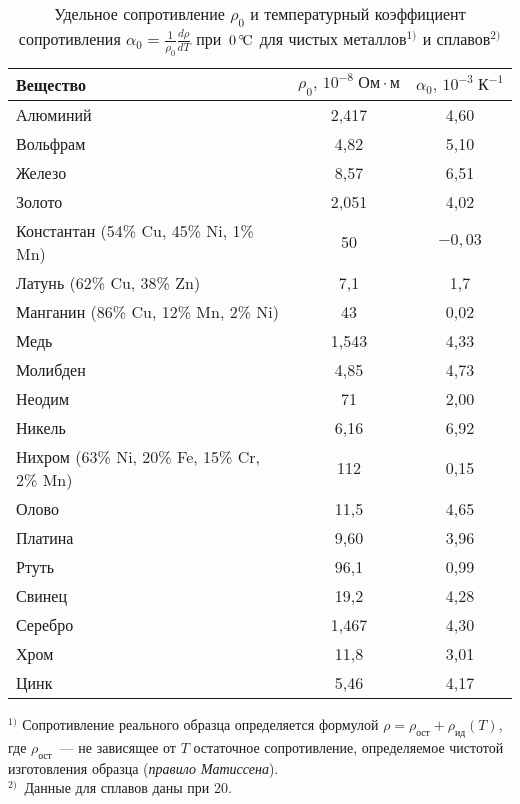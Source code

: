 \begin{table}
\caption{Удельное сопротивление $\rho_0$ и температурный коэффициент 
    сопротивления  $\alpha_0 = \frac{1}{\rho_0}\frac{d\rho}{dT}$ при~$0\,^\circ\!\mathrm{C}$
    для чистых металлов$^{1)}$ и сплавов$^{2)}$}
\small
\begin{tabular}{lcc}
\toprule[1pt]
Вещество &
$\rho_0,\,10^{-8}\;Ом\cdot м$ &
$\alpha_0,\,10^{-3}\;К^{-1}$ \\ 
\midrule[1pt]
Алюминий & 2,417 & 4,60 \\
Вольфрам & 4,82 & 5,10 \\
Железо & 8,57 & 6,51 \\
Золото & 2,051 & 4,02 \\
Константан (54\% Cu, 45\% Ni, 1\% Mn) & 50 & $-0,03$ \\
Латунь (62\% Cu, 38\% Zn) & 7,1 & 1,7 \\
Манганин (86\% Cu, 12\% Mn, 2\% Ni) & 43 & 0,02 \\
Медь & 1,543 & 4,33 \\
Молибден & 4,85 & 4,73 \\
Неодим & 71 & 2,00 \\
Никель & 6,16 & 6,92 \\
Нихром (63\% Ni, 20\% Fe, 15\% Cr, 2\% Mn) & 112 & 0,15 \\
Олово & 11,5 & 4,65 \\
Платина & 9,60 & 3,96 \\
Ртуть & 96,1 & 0,99 \\
Свинец & 19,2 & 4,28 \\
Серебро & 1,467 & 4,30 \\
Хром & 11,8 & 3,01 \\
Цинк & 5,46 & 4,17 \\ 
\bottomrule[1pt]
\end{tabular}
\par\smallskip
$^{1)}$ Сопротивление реального образца определяется формулой
$\rho = \rho_{ост} + \rho_{ид}(T)$, где $\rho_{ост}$~--- 
не зависящее от $T$ остаточное сопротивление, определяемое чистотой 
изготовления образца (\emph{правило Матиссена}).\\
$^{2)}$~Данные для сплавов даны при 20\oC.
\end{table}


